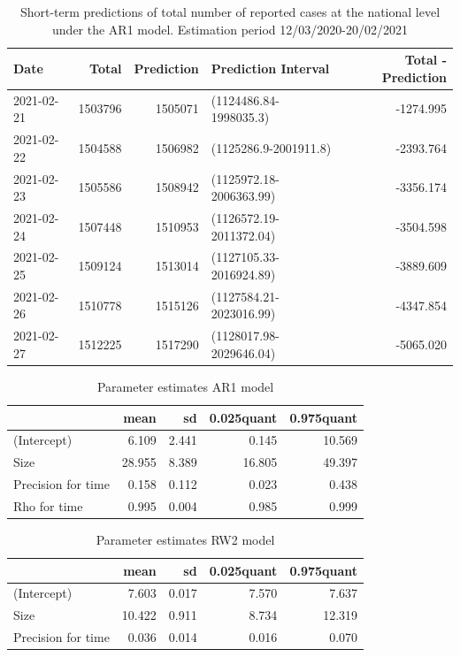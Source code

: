\documentclass[10pt,letterpaper]{article}
\begin{document}
\begin{table}[!h]

\caption{\label{tab:unnamed-chunk-9}Short-term predictions of total number of reported cases at the national level under the AR1 model. Estimation period 12/03/2020-20/02/2021}
\centering
\begin{tabular}[t]{l|r|r|l|r}
\hline
Date & Total & Prediction & Prediction Interval & Total - Prediction\\
\hline
2021-02-21 & 1503796 & 1505071 & (1124486.84-1998035.3) & -1274.995\\
\hline
2021-02-22 & 1504588 & 1506982 & (1125286.9-2001911.8) & -2393.764\\
\hline
2021-02-23 & 1505586 & 1508942 & (1125972.18-2006363.99) & -3356.174\\
\hline
2021-02-24 & 1507448 & 1510953 & (1126572.19-2011372.04) & -3504.598\\
\hline
2021-02-25 & 1509124 & 1513014 & (1127105.33-2016924.89) & -3889.609\\
\hline
2021-02-26 & 1510778 & 1515126 & (1127584.21-2023016.99) & -4347.854\\
\hline
2021-02-27 & 1512225 & 1517290 & (1128017.98-2029646.04) & -5065.020\\
\hline
\end{tabular}
\end{table}

\begin{table}[!h]

\caption{\label{tab:unnamed-chunk-10}Parameter estimates AR1 model}
\centering
\begin{tabular}[t]{l|r|r|r|r}
\hline
  & mean & sd & 0.025quant & 0.975quant\\
\hline
(Intercept) & 6.109 & 2.441 & 0.145 & 10.569\\
\hline
Size & 28.955 & 8.389 & 16.805 & 49.397\\
\hline
Precision for time & 0.158 & 0.112 & 0.023 & 0.438\\
\hline
Rho for time & 0.995 & 0.004 & 0.985 & 0.999\\
\hline
\end{tabular}
\end{table}

\begin{table}[!h]

\caption{\label{tab:unnamed-chunk-10}Parameter estimates RW2 model}
\centering
\begin{tabular}[t]{l|r|r|r|r}
\hline
  & mean & sd & 0.025quant & 0.975quant\\
\hline
(Intercept) & 7.603 & 0.017 & 7.570 & 7.637\\
\hline
Size & 10.422 & 0.911 & 8.734 & 12.319\\
\hline
Precision for time & 0.036 & 0.014 & 0.016 & 0.070\\
\hline
\end{tabular}
\end{table}
\end{document}
